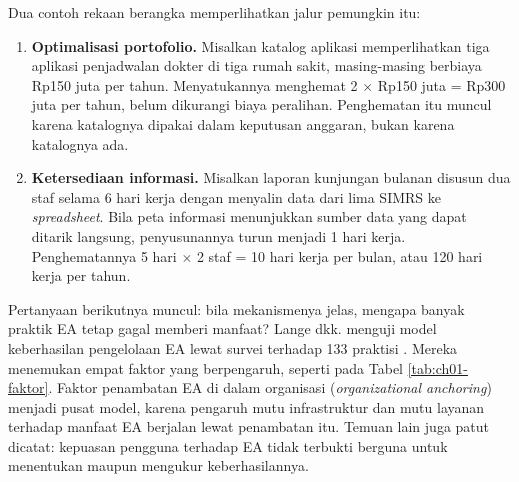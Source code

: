 Dua contoh rekaan berangka memperlihatkan jalur pemungkin itu:

\begin{enumerate}
  \item \textbf{Optimalisasi portofolio.} Misalkan katalog aplikasi
        memperlihatkan tiga aplikasi penjadwalan dokter di tiga rumah sakit,
        masing-masing berbiaya Rp150 juta per tahun. Menyatukannya menghemat
        2 $\times$ Rp150 juta = Rp300 juta per tahun, belum dikurangi biaya
        peralihan. Penghematan itu muncul karena katalognya dipakai dalam
        keputusan anggaran, bukan karena katalognya ada.
  \item \textbf{Ketersediaan informasi.} Misalkan laporan kunjungan bulanan
        disusun dua staf selama 6 hari kerja dengan menyalin data dari lima
        SIMRS ke \textit{spreadsheet}. Bila peta informasi menunjukkan sumber
        data yang dapat ditarik langsung, penyusunannya turun menjadi 1 hari
        kerja. Penghematannya 5 hari $\times$ 2 staf = 10 hari kerja per bulan,
        atau 120 hari kerja per tahun.
\end{enumerate}

Pertanyaan berikutnya muncul: bila mekanismenya jelas, mengapa banyak praktik
EA tetap gagal memberi manfaat? Lange dkk. menguji model keberhasilan
pengelolaan EA lewat survei terhadap 133 praktisi \cite{lange2016}. Mereka
menemukan empat faktor yang berpengaruh, seperti pada Tabel
\ref{tab:ch01-faktor}. Faktor penambatan EA di dalam organisasi
(\textit{organizational anchoring}) menjadi pusat model, karena pengaruh mutu
infrastruktur dan mutu layanan terhadap manfaat EA berjalan lewat penambatan
itu. Temuan lain juga patut dicatat: kepuasan pengguna terhadap EA tidak
terbukti berguna untuk menentukan maupun mengukur keberhasilannya.

